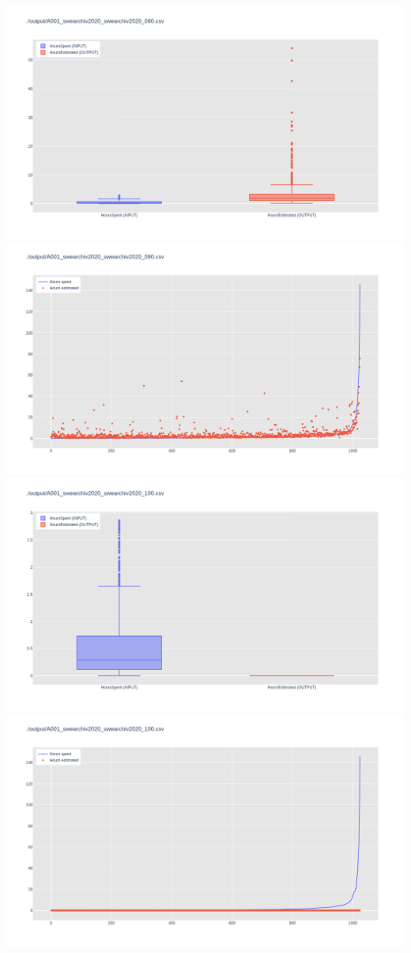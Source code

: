 \includegraphics[width=\textwidth]{Scripts/output/A001_swearchiv2020_swearchiv2020_090.csv.png}
\includegraphics[width=\textwidth]{Scripts/output/A001_swearchiv2020_swearchiv2020_090.csv.scatter.png}
\includegraphics[width=\textwidth]{Scripts/output/A001_swearchiv2020_swearchiv2020_100.csv.png}
\includegraphics[width=\textwidth]{Scripts/output/A001_swearchiv2020_swearchiv2020_100.csv.scatter.png}
